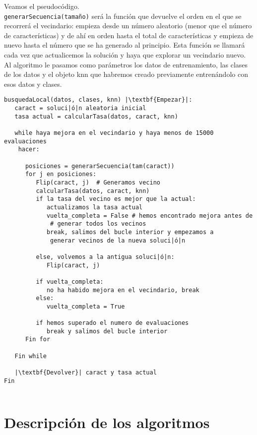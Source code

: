 \documentclass[12pt]{article}
\begin{document}
Veamos el pseudocódigo.\\
\texttt{generarSecuencia(tamaño)} será la función que devuelve el orden en el que se recorrerá el vecindario: empieza desde un número aleatorio (menor que el número de características) y de ahí en orden hasta el total de características y empieza de nuevo hasta el número que se ha generado al principio. Esta función se llamará cada vez que actualicemos la solución y haya que explorar un vecindario nuevo.\\
Al algoritmo le pasamos como parámetros los datos de entrenamiento, las clases de los datos y el objeto knn que habremos creado previamente entrenándolo con esos datos y clases.
\begin{lstlisting}
busquedaLocal(datos, clases, knn) |\textbf{Empezar}|:
   caract = soluci|ó|n aleatoria inicial
   tasa actual = calcularTasa(datos, caract, knn)
   
   while haya mejora en el vecindario y haya menos de 15000 evaluaciones
    hacer:
      
      posiciones = generarSecuencia(tam(caract))
      for j en posiciones:
         Flip(caract, j)  # Generamos vecino
         calcularTasa(datos, caract, knn)
         if la tasa del vecino es mejor que la actual:
            actualizamos la tasa actual
            vuelta_completa = False # hemos encontrado mejora antes de
             # generar todos los vecinos
            break, salimos del bucle interior y empezamos a 
             generar vecinos de la nueva soluci|ó|n
         
         else, volvemos a la antigua soluci|ó|n:
            Flip(caract, j)
            
         if vuelta_completa:
            no ha habido mejora en el vecindario, break
         else:
            vuelta_completa = True
         
         if hemos superado el numero de evaluaciones
            break y salimos del bucle interior
      Fin for
   
   Fin while
   
   |\textbf{Devolver}| caract y tasa actual
Fin
   
\end{lstlisting}

\newpage

\section{Descripción de los algoritmos}
\end{document}

